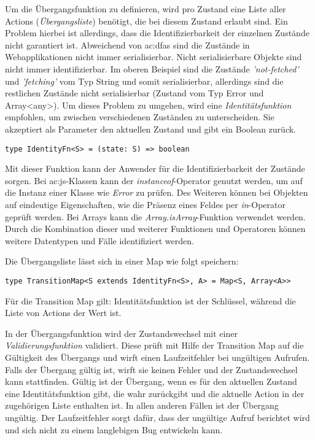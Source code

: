 Um die Übergangsfunktion zu definieren, wird pro Zustand eine Liste aller Actions (\textit{Übergangsliste}) benötigt, die bei diesem Zustand erlaubt sind. Ein Problem hierbei ist allerdings, dass die Identifizierbarkeit der einzelnen Zustände nicht garantiert ist. Abweichend von \acrshort{ac:dfa}s sind die Zustände in Webapplikationen nicht immer serialisierbar. Nicht serialisierbare Objekte sind nicht immer identifizierbar. Im oberen Beispiel sind die Zustände \textit{'not-fetched'} und \textit{'fetching'} vom Typ String und somit serialisierbar, allerdings sind die restlichen Zustände nicht serialisierbar (Zustand vom Typ Error und Array<any>). Um dieses Problem zu umgehen, wird eine \textit{Identitätsfunktion} empfohlen, um zwischen verschiedenen Zuständen zu unterscheiden. Sie akzeptiert als Parameter den aktuellen Zustand und gibt ein Boolean zurück.

\begin{lstlisting}
type IdentityFn<S> = (state: S) => boolean
\end{lstlisting}


Mit dieser Funktion kann der Anwender für die Identifizierbarkeit der Zustände sorgen. Bei \acrlong{ac:js}-Klassen kann der \textit{instanceof}-Operator genutzt werden, um auf die Instanz einer Klasse wie \textit{Error} zu prüfen.\cite{jsInstanceofOperator} Des Weiteren können bei Objekten auf eindeutige Eigenschaften, wie die Präsenz eines Feldes per \textit{in}-Operator geprüft werden.\cite{jsInOperator} Bei Arrays kann die \textit{Array.isArray}-Funktion verwendet werden.\cite{jsIsArray} Durch die Kombination dieser und weiterer Funktionen und Operatoren können weitere Datentypen und Fälle identifiziert werden.

Die Übergangsliste lässt sich in einer Map wie folgt speichern:

\begin{lstlisting}
type TransitionMap<S extends IdentityFn<S>, A> = Map<S, Array<A>>
\end{lstlisting}

Für die Transition Map gilt: Identitätsfunktion ist der Schlüssel, während die Liste von Actions der Wert ist.

In der Übergangsfunktion wird der Zustandswechsel mit einer \textit{Validierungsfunktion} validiert. Diese prüft mit Hilfe der Transition Map auf die Gültigkeit des Übergangs und wirft einen Laufzeitfehler bei ungültigen Aufrufen. Falls der Übergang gültig ist, wirft sie keinen Fehler und der Zustandswechsel kann stattfinden. Gültig ist der Übergang, wenn es für den aktuellen Zustand eine Identitätsfunktion gibt, die wahr zurückgibt und die aktuelle Action in der zugehörigen Liste enthalten ist. In allen anderen Fällen ist der Übergang ungültig. Der Laufzeitfehler sorgt dafür, dass der ungültige Aufruf berichtet wird und sich nicht zu einem langlebigen Bug entwickeln kann.

